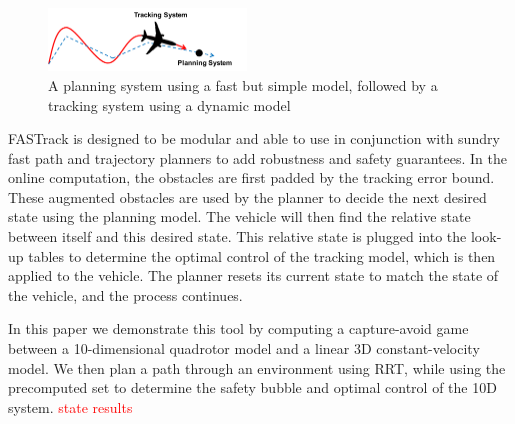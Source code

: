 \begin{figure}
	\centering
	\includegraphics[width=0.47\textwidth]{fig/chasing}
	\caption{A planning system using a fast but simple model, followed by a tracking system using a dynamic model}
	\label{fig:chasing}
\end{figure}
FASTrack is designed to be modular and able to use in conjunction with sundry fast path and trajectory planners to add robustness and safety guarantees. In the online computation, the obstacles are first padded by the tracking error bound. These augmented obstacles are used by the planner to decide the next desired state using the planning model. The vehicle will then find the relative state between itself and this desired state. This relative state is plugged into the look-up tables to determine the optimal control of the tracking model, which is then applied to the vehicle. The planner resets its current state to match the state of the vehicle, and the process continues.

In this paper we demonstrate this tool by computing a capture-avoid game between a 10-dimensional quadrotor model and a linear 3D constant-velocity model. We then plan a path through an environment using RRT, while using the precomputed set to determine the safety bubble and optimal control of the 10D system. \textcolor{red}{state results}